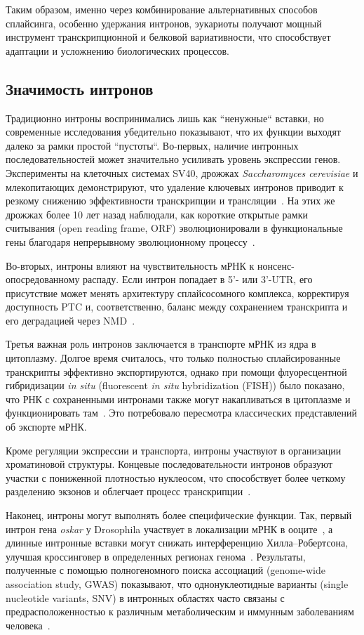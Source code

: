 Таким образом, именно через комбинирование альтернативных способов сплайсинга, особенно удержания интронов, эукариоты получают мощный инструмент транскрипционной и белковой вариативности, что способствует адаптации и усложнению биологических процессов.


\subsection{Значимость интронов}

Традиционно интроны воспринимались лишь как ``ненужные`` вставки, но современные исследования убедительно показывают, что их функции выходят далеко за рамки простой ``пустоты``.
Во-первых, наличие интронных последовательностей может значительно усиливать уровень экспрессии генов.
Эксперименты на клеточных системах SV40, дрожжах \textit{Saccharomyces cerevisiae} и млекопитающих демонстрируют, что удаление ключевых интронов приводит к резкому снижению эффективности транскрипции и трансляции~\cite{Gruss1979,Juneau2006}.
На этих же дрожжах более 10 лет назад наблюдали, как короткие открытые рамки считывания (open reading frame, ORF) эволюционировали в функциональные гены благодаря непрерывному эволюционному процессу~\cite{Carvunis2012}.

Во-вторых, интроны влияют на чувствительность мРНК к нонсенс-опосредован\-ному распаду.
Если интрон попадает в 5'- или 3'-UTR, его присутствие может менять архитектуру сплайсосомного комплекса, корректируя доступность PTC и, соответственно, баланс между сохранением транскрипта и его деградацией через NMD~\cite{Jo2015,Kalyna2012}.

Третья важная роль интронов заключается в транспорте мРНК из ядра в цитоплазму.
Долгое время считалось, что только полностью сплайсированные транскрипты эффективно экспортируются, однако при помощи флуоресцентной гибридизации \textit{in situ} (fluorescent \textit{in situ} hybridization (FISH)) было показано, что РНК с сохраненными интронами также могут накапливаться в цитоплазме и функционировать там~\cite{Valencia2008,Jo2015,Roy2006}.
Это потребовало пересмотра классических представлений об экспорте мРНК.

Кроме регуляции экспрессии и транспорта, интроны участвуют в организации хроматиновой структуры.
Концевые последовательности интронов образуют участки с пониженной плотностью нуклеосом, что способствует более четкому разделению экзонов и облегчает процесс транскрипции~\cite{Schwartz2009}.

Наконец, интроны могут выполнять более специфические функции.
Так, первый интрон гена \textit{oskar} у Drosophila участвует в локализации мРНК в ооците~\cite{Siemens2004}, а длинные интронные вставки могут снижать интерференцию Хилла–Робертсона, улучшая кроссинговер в определенных регионах генома~\cite{Comeron2008}.
Результаты, полученные с помощью полногеномного поиска ассоциаций (genome-wide association study, GWAS) показывают, что однонуклеотидные варианты (single nucleotide variants, SNV) в интронных областях часто связаны с предрасположенностью к различным метаболическим и иммунным заболеваниям человека~\cite{Welter2014}.

